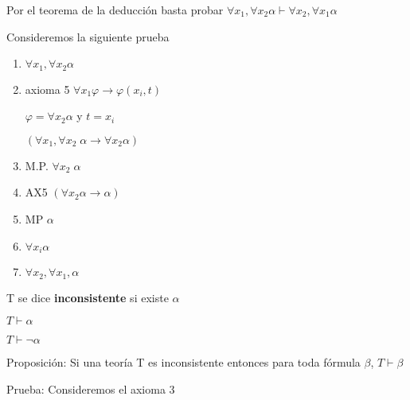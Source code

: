 Por el teorema de la deducci\'on basta probar $\forall x_1, \forall x_2 \alpha \vdash \forall x_2, \forall x_1 \alpha$

Consideremos la siguiente prueba

\begin{enumerate}
	\item $\forall x_1, \forall x_2 \alpha$
	\item axioma 5 $\forall x_1 \varphi \rightarrow \varphi(x_i, t)$
	
	$\varphi = \forall x_2 \alpha$ y $t = x_i$
	
	$(\forall x_1, \forall x_2 \; \alpha \rightarrow \forall x_2 \alpha)$
	
	\item M.P. $\forall x_2 \; \alpha$
	
	\item AX5 $(\forall x_2 \alpha \rightarrow \alpha)$
	
	\item MP $\alpha$
	
	\item $\forall x_i \alpha$
	
	\item $\forall x_2, \forall x_1, \alpha$
\end{enumerate}




T se dice \textbf{inconsistente} si existe $\alpha$

$T \vdash \alpha$

$T \vdash \neg \alpha$

Proposici\'on: Si una teor\'ia T es inconsistente entonces para toda f\'ormula $\beta$, $T \vdash \beta$

Prueba: Consideremos el axioma 3

